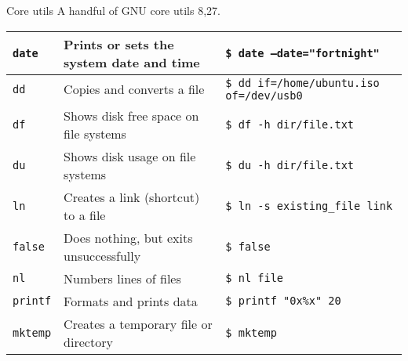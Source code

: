 \documentclass{beamer}
\let\tt\texttt
\begin{document}
\begin{frame}{Core utils}
        A handful of GNU core utils 8,27. \\
        \begin{tabular}{p{} p{} p{}}
                \hline
                \tt{date}             &
                Prints or sets the system date and time &
                \tt{\$ date --date="fortnight"}       \\
                \hline
                \tt{dd}             &
                Copies and converts a file  &
                \tt{\$ dd if=/home/ubuntu.iso of=/dev/usb0}       \\
                \hline
                \tt{df}             &
                Shows disk free space on file systems   &
                \tt{\$ df -h dir/file.txt}       \\
                \hline
                \tt{du}             &
                Shows disk usage on file systems &
                \tt{\$ du -h dir/file.txt}       \\
                \hline
                \tt{ln}             &
                Creates a link (shortcut) to a file &
                \tt{\$ ln -s existing\_file link}       \\
                \hline
                \tt{false}             &
                Does nothing, but exits unsuccessfully &
                \tt{\$ false}       \\
                \hline
                \tt{nl}             &
                Numbers lines of files &
                \tt{\$ nl file}       \\
                \hline
                \tt{printf}             &
                Formats and prints data  &
                \tt{\$ printf "0x\%x" 20}       \\
                \hline
                \tt{mktemp}             &
                Creates a temporary file or directory &
                \tt{\$ mktemp }       \\
                \hline
        \end{tabular}
\end{frame}
\end{document}
